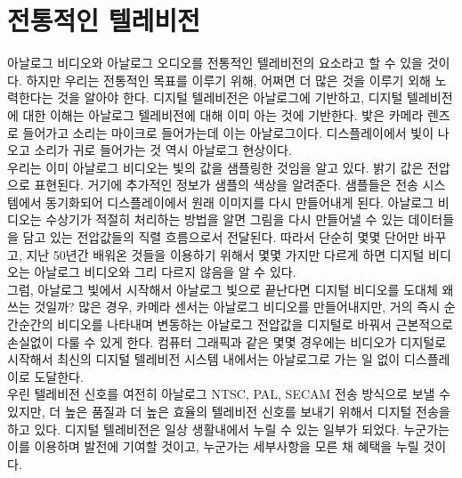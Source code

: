 \section{전통적인 텔레비전}
아날로그 비디오와 아날로그 오디오를 전통적인 텔레비전의 요소라고 할 수 있을 것이다. 하지만 우리는 전통적인 목표를 이루기 위해, 어쩌면 더 많은 것을 이루기 외해 노력한다는 것을 알아야 한다.
디지털 텔레비전은 아날로그에 기반하고, 디지털 텔레비전에 대한 이해는 아날로그 텔레비전에 대해 이미 아는 것에 기반한다.
밫은 카메라 렌즈로 들어가고 소리는 마이크로 들어가는데 이는 아날로그이다. 디스플레이에서 빛이 나오고 소리가 귀로 들어가는 것 역시 아날로그 현상이다.
\\
우리는 이미 아날로그 비디오는 빛의 값을 샘플링한 것임을 알고 있다. 밝기 값은 전압으로 표현된다. 거기에 추가적인 정보가 샘플의 색상을 알려준다.
샘플들은 전송 시스템에서 동기화되어 디스플레이에서 원래 이미지를 다시 만들어내게 된다.
아날로그 비디오는 수상기가 적절히 처리하는 방법을 알면 그림을 다시 만들어낼 수 있는 데이터들을 담고 있는 전압값들의 직렬 흐름으로서 전달된다.
따라서 단순히 몇몇 단어만 바꾸고, 지난 50년간 배워온 것들을 이용하기 위해서 몇몇 가지만 다르게 하면 디지털 비디오는 아날로그 비디오와 그리 다르지 않음을 알 수 있다.
\\
그럼, 아날로그 빛에서 시작해서 아날로그 빛으로 끝난다면 디지털 비디오를 도대체 왜 쓰는 것일까?
많은 경우, 카메라 센서는 아날로그 비디오를 만들어내지만, 거의 즉시 순간순간의 비디오를 나타내며 변동하는 아날로그 전압값을 디지털로 바꿔서 근본적으로 손실없이 다룰 수 있게 한다.
컴퓨터 그래픽과 같은 몇몇 경우에는 비디오가 디지털로 시작해서 최신의 디지털 텔레비전 시스템 내에서는 아날로그로 가는 일 없이 디스플레이로 도달한다.
\\
우린 텔레비전 신호를 여전히 아날로그 NTSC, PAL, SECAM 전송 방식으로 보낼 수 있지만, 더 높은 품질과 더 높은 효율의 텔레비전 신호를 보내기 위해서 디지털 전송을 하고 있다.
디지털 텔레비전은 일상 생활내에서 누릴 수 있는 일부가 되었다. 누군가는 이를 이용하며 발전에 기여할 것이고, 누군가는 세부사항을 모른 채 혜택을 누릴 것이다.